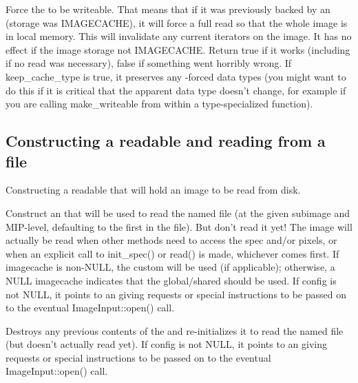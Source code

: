 \NEW %
Force the \ImageBuf to be writeable. That means that if it was previously
backed by an \ImageCache (storage was {\cf IMAGECACHE}), it will force a
full read so that the whole image is in local memory.
This will invalidate any current iterators on the image. It has
no effect if the image storage not {\cf IMAGECACHE}.  Return {\cf true} if
it works (including if no read was necessary), {\cf false} if something went
horribly wrong. If {\cf keep_cache_type} is true, it preserves any
\ImageCache-forced data types (you might want to do this if it is critical
that the apparent data type doesn't change, for example if you are calling
make_writeable from within a type-specialized function).
\apiend

\subsection*{Constructing a readable \ImageBuf and reading from a file}

Constructing a readable \ImageBuf that will hold an image to be read
from disk.

Construct an \ImageBuf that will be used to read the named file (at the
given subimage and MIP-level, defaulting to the first in the file).  But
don't read it yet!  The image will actually be read when other methods
need to access the spec and/or pixels, or when an explicit call to
{\cf init_spec()} or {\cf read()} is made, whichever comes first. 
If {\cf imagecache} is non-NULL, the custom
\ImageCache will be used (if applicable); otherwise, a NULL imagecache
indicates that the global/shared \ImageCache should be used.
If {\cf config} is not NULL, it points to an \ImageSpec giving requests
or special instructions to be passed on to the eventual
{\cf ImageInput::open()} call.
\apiend

Destroys any previous contents of the \ImageBuf and re-initializes it
to read the named file (but doesn't actually read yet).
If {\cf config} is not NULL, it points to an \ImageSpec giving requests
or special instructions to be passed on to the eventual
{\cf ImageInput::open()} call.
\apiend

